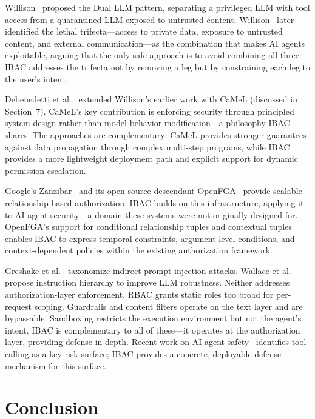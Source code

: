 \documentclass[11pt]{article}
\begin{document}
Willison~\cite{willison2023dual} proposed the Dual LLM pattern, separating a privileged LLM with tool access from a quarantined LLM exposed to untrusted content. Willison~\cite{willison2025trifecta} later identified the lethal trifecta---access to private data, exposure to untrusted content, and external communication---as the combination that makes AI agents exploitable, arguing that the only safe approach is to avoid combining all three. IBAC addresses the trifecta not by removing a leg but by constraining each leg to the user's intent.

Debenedetti et al.~\cite{debenedetti2025camel} extended Willison's earlier work with CaMeL (discussed in Section~7). CaMeL's key contribution is enforcing security through principled system design rather than model behavior modification---a philosophy IBAC shares. The approaches are complementary: CaMeL provides stronger guarantees against data propagation through complex multi-step programs, while IBAC provides a more lightweight deployment path and explicit support for dynamic permission escalation.

Google's Zanzibar~\cite{pang2019zanzibar} and its open-source descendant OpenFGA~\cite{openfga} provide scalable relationship-based authorization. IBAC builds on this infrastructure, applying it to AI agent security---a domain these systems were not originally designed for. OpenFGA's support for conditional relationship tuples and contextual tuples enables IBAC to express temporal constraints, argument-level conditions, and context-dependent policies within the existing authorization framework.

Greshake et al.~\cite{greshake2023indirect} taxonomize indirect prompt injection attacks. Wallace et al.~\cite{wallace2024hierarchy} propose instruction hierarchy to improve LLM robustness. Neither addresses authorization-layer enforcement. RBAC grants static roles too broad for per-request scoping. Guardrails and content filters operate on the text layer and are bypassable. Sandboxing restricts the execution environment but not the agent's intent. IBAC is complementary to all of these---it operates at the authorization layer, providing defense-in-depth. Recent work on AI agent safety~\cite{ruan2024risks} identifies tool-calling as a key risk surface; IBAC provides a concrete, deployable defense mechanism for this surface.

\section{Conclusion}
\end{document}
